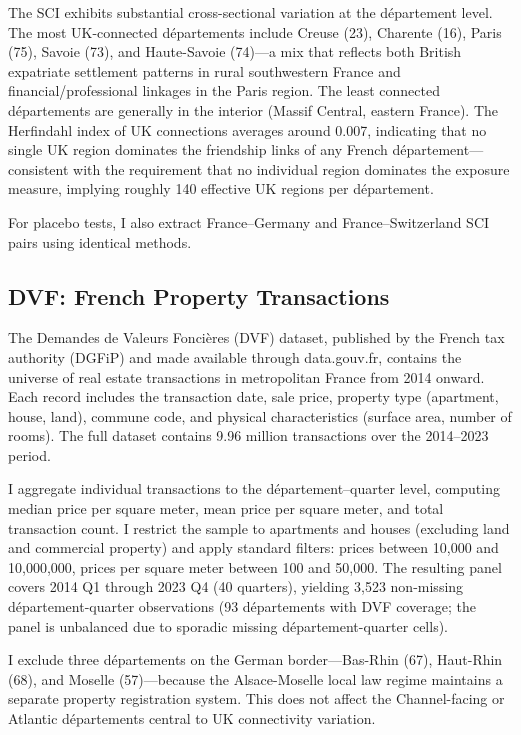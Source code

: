 \documentclass[12pt]{article}
\providecommand{\EUR}[1]{\texteuro{}#1}
\begin{document}
The SCI exhibits substantial cross-sectional variation at the d\'epartement level. The most UK-connected d\'epartements include Creuse (23), Charente (16), Paris (75), Savoie (73), and Haute-Savoie (74)---a mix that reflects both British expatriate settlement patterns in rural southwestern France and financial/professional linkages in the Paris region. The least connected d\'epartements are generally in the interior (Massif Central, eastern France). The Herfindahl index of UK connections averages around 0.007, indicating that no single UK region dominates the friendship links of any French d\'epartement---consistent with the requirement that no individual region dominates the exposure measure, implying roughly 140 effective UK regions per d\'epartement.

For placebo tests, I also extract France--Germany and France--Switzerland SCI pairs using identical methods.

\subsection{DVF: French Property Transactions}

The Demandes de Valeurs Fonci\`eres (DVF) dataset, published by the French tax authority (DGFiP) and made available through data.gouv.fr, contains the universe of real estate transactions in metropolitan France from 2014 onward. Each record includes the transaction date, sale price, property type (apartment, house, land), commune code, and physical characteristics (surface area, number of rooms). The full dataset contains 9.96 million transactions over the 2014--2023 period.

I aggregate individual transactions to the d\'epartement--quarter level, computing median price per square meter, mean price per square meter, and total transaction count. I restrict the sample to apartments and houses (excluding land and commercial property) and apply standard filters: prices between \EUR{10,000} and \EUR{10,000,000}, prices per square meter between \EUR{100} and \EUR{50,000}. The resulting panel covers 2014 Q1 through 2023 Q4 (40 quarters), yielding 3,523 non-missing d\'epartement-quarter observations (93 d\'epartements with DVF coverage; the panel is unbalanced due to sporadic missing d\'epartement-quarter cells).

I exclude three d\'epartements on the German border---Bas-Rhin (67), Haut-Rhin (68), and Moselle (57)---because the Alsace-Moselle local law regime maintains a separate property registration system. This does not affect the Channel-facing or Atlantic d\'epartements central to UK connectivity variation.
\end{document}
